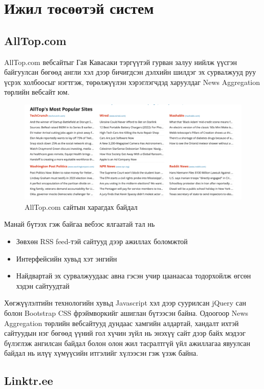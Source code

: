 \section{Ижил төсөөтэй систем}

\subsection{AllTop.com}

AllTop.com вебсайтыг Гая Кавасаки тэргүүтэй гурван залуу нийлж үүсгэн байгуулсан бөгөөд англи хэл дээр бичигдсэн дэлхийн шилдэг эх сурвалжууд руу үсрэх холбоосыг нэгтгэж, төрөлжүүлэн хэрэглэгчдэд харуулдаг News Aggregation төрлийн вебсайт юм. 

\begin{figure}[h]
	\centering
	\includegraphics[width=15cm]{images/alltop.png}
	\caption{AllTop.com сайтын харагдах байдал}
	\label{fig:alltop}
\end{figure}

Манай бүтээх гэж байгаа вебээс ялгаатай тал нь 
\begin{itemize}
	\item Зөвхөн RSS feed-тэй сайтууд дээр ажиллах боломжтой
	\item Интерфейсийн хувьд хэт энгийн
	\item Найдвартай эх сурвалжуудаас авна гэсэн учир цаанаасаа тодорхойлж өгсөн хэдэн сайтуудтай
\end{itemize}

Хөгжүүлэлтийн технологийн хувьд Javascript хэл дээр суурилсан jQuery сан болон Bootstrap CSS фрэймворкийг ашиглан бүтээсэн байна. Одоогоор News Aggregation төрлийн вебсайтууд дундаас хамгийн алдартай, хандалт ихтэй сайтуудын нэг бөгөөд үүний гол хүчин зүйл нь энэхүү сайт дээр байх мэдээг бүлэглэж ангилсан байдал болон олон жил тасралтгүй үйл ажиллагаа явуулсан байдал нь илүү хүмүүсийн итгэлийг хүлээсэн гэж үзэж байна. 

\subsection{Linktr.ee}

